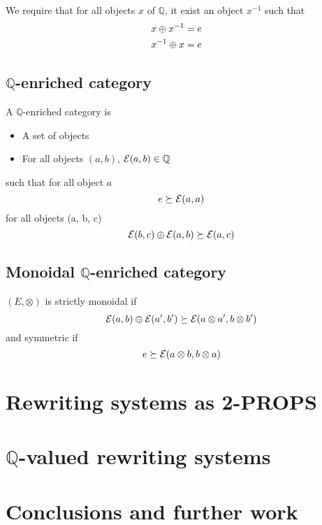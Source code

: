 \documentclass[a4paper]{article}
\begin{document}
We require that for all objects $x$ of $\mathbb{Q}$, it exist an object $x^{-1}$ such that
\begin{align}
x \oplus x^{-1} &= e \cr
x^{-1} \oplus x &= e
\end{align}

\subsection{$\mathbb{Q}$-enriched category}

A $\mathbb{Q}$-enriched category \catE is

\begin{itemize}
\item A set of objects
\item For all objects $(a, b)$, ${\cal E}(a, b) \in \mathbb{Q}$
\end{itemize}

such that for all object $a$
$$
e \succeq {\cal E}(a, a)
$$
for all objects (a, b, c)
$$
{\cal E}(b, c) \oplus {\cal E}(a, b) \succeq {\cal E}(a, c)
$$

\subsection{Monoidal $\mathbb{Q}$-enriched category}

$(E, \otimes)$ is strictly monoidal if
$$
{\cal E}(a, b) \oplus {\cal E}(a', b') \succeq {\cal E}(a \otimes a', b \otimes b')
$$
and symmetric if
$$
e \succeq {\cal E}(a \otimes b, b \otimes a)
$$

\section{Rewriting systems as 2-PROPS}
\label{sec:rewriting}

\section{$\mathbb{Q}$-valued rewriting systems}

\section{Conclusions and further work}
\label{sec:conclusion}



\small

\end{document}
